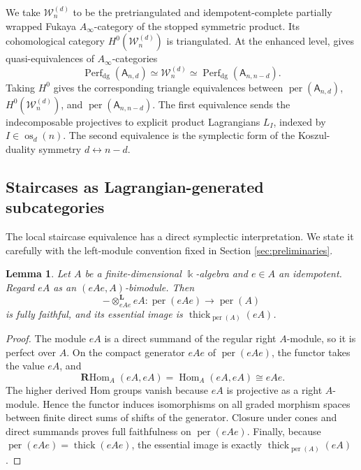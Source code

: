 \documentclass[12pt,a4paper,english,reqno]{amsart}
\theoremstyle{plain}
\newtheorem{lemma}[theorem]{Lemma}
\theoremstyle{definition}
\newcommand{\kk}{\Bbbk}
\newcommand{\perf}{\operatorname{per}}
\newcommand{\Hom}{\operatorname{Hom}}
\newcommand{\RHom}{\operatorname{\mathbf{R}Hom}}
\newcommand{\thick}{\operatorname{thick}}
\newcommand{\os}{\operatorname{os}}
\newcommand{\Wcat}{\mathcal W}
\begin{document}
We take $\Wcat_n^{(d)}$ to be the pretriangulated and idempotent-complete
partially wrapped Fukaya $A_\infty$-category of the stopped symmetric
product.  Its cohomological category $H^0(\Wcat_n^{(d)})$ is triangulated.
At the enhanced level, \cite[Theorems~1 and~2]{DJL} gives
quasi-equivalences of $A_\infty$-categories
\begin{equation}
 \operatorname{Perf}_{\mathrm{dg}}(\mathsf A_{n,d})
 \simeq\Wcat_n^{(d)}
 \simeq\operatorname{Perf}_{\mathrm{dg}}(\mathsf A_{n,n-d}).
\label{eq:DJL-equivalences}
\end{equation}
Taking $H^0$ gives the corresponding triangle equivalences between
$\perf(\mathsf A_{n,d})$, $H^0(\Wcat_n^{(d)})$, and
$\perf(\mathsf A_{n,n-d})$.
The first equivalence sends the indecomposable projectives to explicit
product Lagrangians $L_I$, indexed by
$I\in\os_d(n)$.  The second equivalence is the symplectic form of the
Koszul-duality symmetry $d\leftrightarrow n-d$.

\subsection{Staircases as Lagrangian-generated subcategories}

The local staircase equivalence has a direct symplectic interpretation.  We
state it carefully with the left-module convention fixed in
Section \ref{sec:preliminaries}.

\begin{lemma}
\label{lem:corner-perfect}
Let $A$ be a finite-dimensional $\kk$-algebra and $e\in A$ an
idempotent.  Regard $eA$ as an $(eAe,A)$-bimodule.  Then
\[
 -\otimes_{eAe}^{\mathbf L}eA\colon
 \perf(eAe)\longrightarrow\perf(A)
\]
is fully faithful, and its essential image is
$\thick_{\perf(A)}(eA)$.
\end{lemma}

\begin{proof}
The module $eA$ is a direct summand of the regular right $A$-module, so
it is perfect over $A$.  On the compact generator $eAe$ of
$\perf(eAe)$, the functor takes the value $eA$, and
\[
 \RHom_A(eA,eA)=\Hom_A(eA,eA)\cong eAe.
\]
The higher derived Hom groups vanish because $eA$ is projective as a right
$A$-module.  Hence the functor induces isomorphisms on all graded
morphism spaces between finite direct sums of shifts of the generator.
Closure under cones and direct summands proves full faithfulness on
$\perf(eAe)$.  Finally, because $\perf(eAe)=\thick(eAe)$, the essential
image is exactly $\thick_{\perf(A)}(eA)$.
\end{proof}
\end{document}
